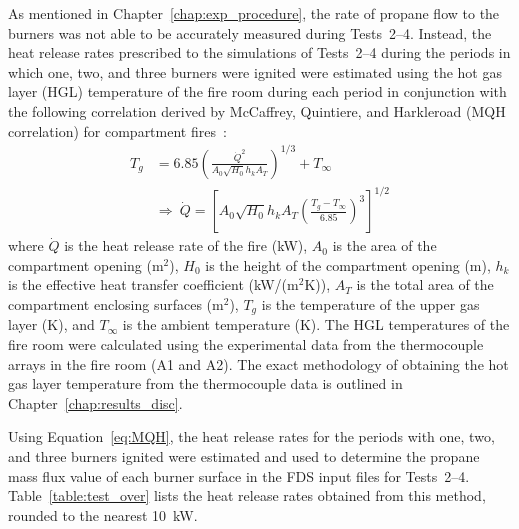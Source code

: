 As mentioned in Chapter~\ref{chap:exp_procedure}, the rate of propane flow to the burners was not able to be accurately measured during Tests~2--4. Instead, the heat release rates prescribed to the simulations of Tests~2--4 during the periods in which one, two, and three burners were ignited were estimated using the hot gas layer (HGL) temperature of the fire room during each period in conjunction with the following correlation derived by McCaffrey, Quintiere, and Harkleroad (MQH correlation) for compartment fires~\cite{McCaffery:1}: 
\begin{equation}
\label{eq:MQH}
\begin{split}
  T_g &= 6.85 \left( \frac{\dot{Q}^2}{A_0 \sqrt{H_0} h_k A_T}\right)^{1/3}+T_{\infty} \\
  &\Rightarrow~\dot{Q} = \left[A_0  \sqrt{H_0} h_k A_T \left( \frac{T_g-T_{\infty}}{6.85}\right)^3\right]^{1/2}
\end{split}
\end{equation}
where $\dot{Q}$ is the heat release rate of the fire (kW), $A_0$ is the area of the compartment opening (m$^2$), $H_0$ is the height of the compartment opening (m), $h_k$ is the effective heat transfer coefficient (kW/(m$^2$K)), $A_T$ is the total area of the compartment enclosing surfaces (m$^2$), $T_g$ is the temperature of the upper gas layer (K), and $T_{\infty}$ is the ambient temperature (K). The HGL temperatures of the fire room were calculated using the experimental data from the thermocouple arrays in the fire room (A1 and A2). The exact methodology of obtaining the hot gas layer temperature from the thermocouple data is outlined in Chapter~\ref{chap:results_disc}. 

Using Equation~\ref{eq:MQH}, the heat release rates for the periods with one, two, and three burners ignited were estimated and used to determine the propane mass flux value of each burner surface in the FDS input files for Tests~2--4. Table~\ref{table:test_over} lists the heat release rates obtained from this method, rounded to the nearest 10~kW.


